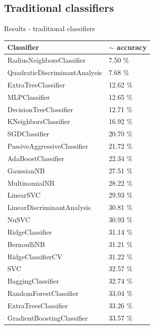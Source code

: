 \documentclass{beamer}
\newcommand\Fontsmall{\fontsize{8}{7.2}\selectfont}
\begin{document}
\begin{darkframes}
    \subsection{Traditional classifiers}
    \begin{frame}{Results - traditional classifiers}
      \Fontsmall
      \begin{table}[!b]
        {\carlitoTLF %
        \begin{tabularx}{\textwidth}{XX}
          \toprule
          Classifier & $\sim$ accuracy \\
          \toprule 
          RadiusNeighborsClassifier & 7.50 \% \\
          QuadraticDiscriminantAnalysis & 7.68 \% \\
          ExtraTreeClassifier & 12.62 \% \\
          MLPClassifier & 12.65 \% \\
          DecisionTreeClassifier & 12.71 \% \\
          KNeighborsClassifier & 16.92 \% \\
          SGDClassifier & 20.70 \% \\
          PassiveAggressiveClassifier & 21.72 \% \\
          AdaBoostClassifier & 22.34 \% \\
          GaussianNB & 27.51 \% \\
          MultinomialNB & 28.22 \% \\
          LinearSVC & 29.93 \% \\
          LinearDiscriminantAnalysis & 30.81 \% \\
          NuSVC & 30.93 \% \\
          RidgeClassifier & 31.14 \% \\
          BernoulliNB & 31.21 \% \\
          RidgeClassifierCV & 31.22 \% \\
          SVC & 32.57 \% \\
          BaggingClassifier & 32.74 \% \\
          RandomForestClassifier & 33.04 \% \\
          ExtraTreesClassifier & 33.26 \% \\
          GradientBoostingClassifier & 33.57 \% \\ 
          \bottomrule
        \end{tabularx}}
      \end{table}
    \end{frame}
      

\end{darkframes}
\end{document}
